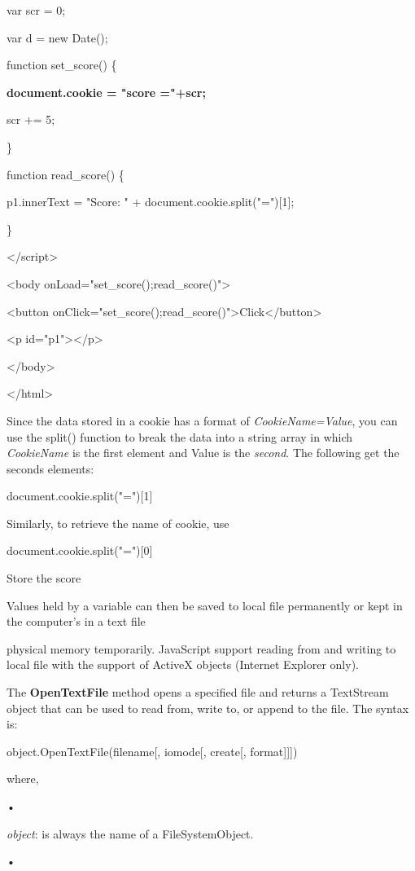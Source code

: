\documentclass[
]{article}
\begin{document}
var scr = 0;

var d = new Date();

function set\_score() \{

\textbf{document.cookie = "score ="+scr;}

scr += 5;

\}

function read\_score() \{

p1.innerText = "Score: " + document.cookie.split("="){[}1{]};

\}

\textless/script\textgreater{}

\textless body onLoad="set\_score();read\_score()"\textgreater{}

\textless button
onClick="set\_score();read\_score()"\textgreater Click\textless/button\textgreater{}

\textless p id="p1"\textgreater\textless/p\textgreater{}

\textless/body\textgreater{}

\textless/html\textgreater{}

Since the data stored in a cookie has a format of
\emph{CookieName=Value}, you can use the split() function to break the
data into a string array in which \emph{CookieName} is the first element
and Value is the \emph{second}. The following get the seconds elements:

document.cookie.split("="){[}1{]}

Similarly, to retrieve the name of cookie, use

document.cookie.split("="){[}0{]}

Store the score

Values held by a variable can then be saved to local file permanently or
kept in the computer's in a text file

physical memory temporarily. JavaScript support reading from and writing
to local file with the support of ActiveX objects (Internet Explorer
only).

The \textbf{OpenTextFile} method opens a specified file and returns a
TextStream object that can be used to read from, write to, or append to
the file. The syntax is:

object.OpenTextFile(filename{[}, iomode{[}, create{[}, format{]}{]}{]})

where,

•

\emph{object}: is always the name of a FileSystemObject.

•
\end{document}
